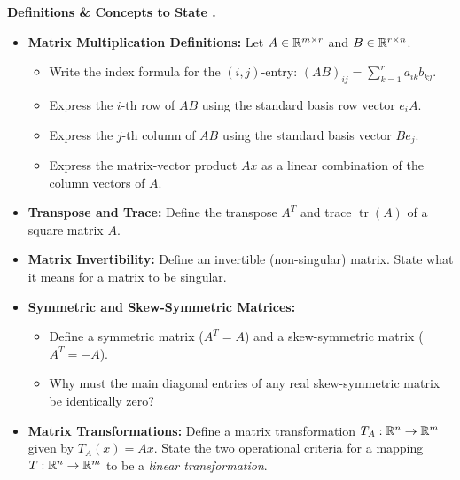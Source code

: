\documentclass{natsirt}
\newcounter{topic}[section]
\newenvironment{recallbox}[1][]{%
    \begin{bluebox}[#1]\refstepcounter{topic}\textbf{Definitions \& Concepts to State \thesection.\thetopic}%
}{\end{bluebox}}
\newcommand{\citem}{\item[$\square$]}
\newcommand{\tr}{\operatorname{tr}}
\begin{document}
\begin{recallbox}
\begin{itemize}
        \citem \textbf{Matrix Multiplication Definitions:} Let $A \in \mathbb{R}^{m \times r}$ and $B \in \mathbb{R}^{r \times n}$.
        \begin{itemize}
            \item Write the index formula for the $(i, j)$-entry: $(AB)_{ij} = \sum_{k=1}^r a_{ik}b_{kj}$.
            \item Express the $i$-th row of $AB$ using the standard basis row vector $e_i A$.
            \item Express the $j$-th column of $AB$ using the standard basis vector $B e_j$.
            \item Express the matrix-vector product $Ax$ as a linear combination of the column vectors of $A$.
        \end{itemize}
        \citem \textbf{Transpose and Trace:} Define the transpose $A^T$ and trace $\tr(A)$ of a square matrix $A$.
        \citem \textbf{Matrix Invertibility:} Define an invertible (non-singular) matrix. State what it means for a matrix to be singular.
        \citem \textbf{Symmetric and Skew-Symmetric Matrices:}
        \begin{itemize}
            \item Define a symmetric matrix ($A^T = A$) and a skew-symmetric matrix ($A^T = -A$).
            \item Why must the main diagonal entries of any real skew-symmetric matrix be identically zero?
        \end{itemize}
        \citem \textbf{Matrix Transformations:} Define a matrix transformation $T_A: \mathbb{R}^n \to \mathbb{R}^m$ given by $T_A(x) = Ax$. State the two operational criteria for a mapping $T: \mathbb{R}^n \to \mathbb{R}^m$ to be a \emph{linear transformation}.
    \end{itemize}
\end{recallbox}
\end{document}
